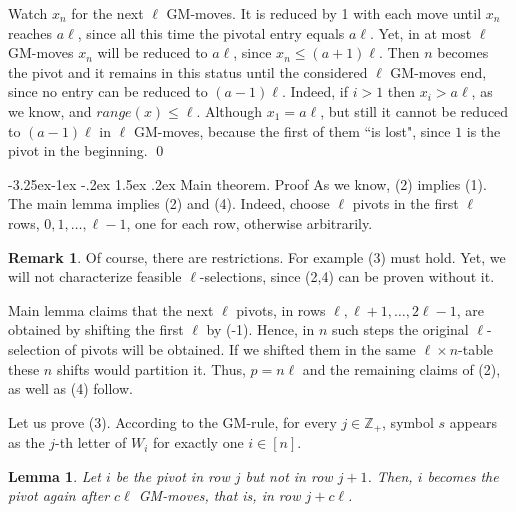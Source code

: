 \documentclass[10pt]{article}
\makeatletter
\renewcommand\subsection{\@startsection{subsection}{2}{\z@}
{-3.25ex\@plus -1ex \@minus -.2ex}
{1.5ex \@plus .2ex}
{\normalfont\normalsize\bfseries\boldmath}}
\newtheorem{lemma}{Lemma}
\theoremstyle{definition}
\newtheorem{remark}{Remark}
\def\ZZ{\mathbb{Z}}
\makeatother
\begin{document}
Watch $x_n$ for the next $\ell$  GM-moves.
It is reduced by 1 with each move  
until $x_n$  reaches $a \ell$, 
since  all this time 
the pivotal entry equals $a \ell$.  
Yet, in at most  $\ell$  GM-moves  
$x_n$  will be reduced to $a \ell$, 
since $x_n \leq (a+1) \ell$.  
Then $n$ becomes the pivot and 
it remains in this status 
until the considered  $\ell$  GM-moves end, 
since no entry can be reduced to $(a-1) \ell$.
Indeed, if  $i > 1$  then  $x_i > a \ell$, as we know, 
and $range(x) \leq \ell$.  
Although  $x_1 = a \ell$, 
but still it cannot be reduced to $(a-1) \ell$
in $\ell$  GM-moves, 
because the first of them ``is lost", 
since  $1$ is the pivot in the beginning. 
\qed 

\subsection{Main theorem. Proof} 
\label{ss-main-proof}
As we know, (2) implies (1).
The main lemma implies (2)  and (4).
Indeed, choose $\ell$ pivots in the first $\ell$ rows, 
$0, 1, \ldots, \ell -1$, 
one for each row, otherwise arbitrarily.  

\begin{remark} 
Of course, there are restrictions.  
For example (3) must hold. 
Yet, we will not characterize 
feasible $\ell$-selections, 
since (2,4) can be proven without it.
\end{remark} 

Main lemma claims that the next $\ell$  pivots, 
in rows $\ell, \ell+1, \ldots, 2\ell-1$,
are obtained by shifting the first $\ell$ by (-1).
Hence, in $n$  such steps   
the original $\ell$-selection of pivots will be obtained.
If we shifted them in the same  $\ell \times n$-table 
these $n$ shifts would partition it.
Thus, $p = n \ell$ and the remaining claims of (2), 
as well as (4) follow. 

Let us prove  (3).
According to the GM-rule, for every  $j \in \ZZ_+$,   
symbol $s$ appears as the $j$-th letter of  $W_i$ 
for exactly one  $i \in [n]$. 

 
\begin{lemma}
\label{l3}
Let  $i$  be the pivot in row $j$ but not in row $j+1$. 
Then,  $i$  becomes the pivot again 
after $c \ell$  GM-moves, that is, in row $j + c\ell$.
\end{lemma} 
\end{document}
